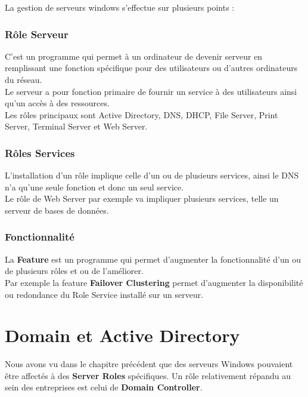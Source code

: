 \documentclass{report}
\begin{document}
		La gestion de serveurs windows s'effectue sur plusieurs points : \\

		\subsection{Rôle Serveur}

			C'est un programme qui permet à un ordinateur de devenir serveur en remplissant une fonction spécifique pour des utilisateurs ou d'autres ordinateurs du réseau.\\
			Le serveur a pour fonction primaire de fournir un service à des utilisateurs ainsi qu'un accès à des ressources.\\
			Les rôles principaux sont Active Directory, DNS, DHCP, File Server, Print Server, Terminal Server et Web Server.\\

		\subsection{Rôles Services}

			L'installation d'un rôle implique celle d'un ou de plusieurs services, ainsi le DNS n'a qu'une seule fonction et donc un seul service.\\
			Le rôle de Web Server par exemple va impliquer plusieurs services, telle un serveur de bases de données.\\

		\subsection{Fonctionnalité}

			La \textbf{Feature} est un programme qui permet d'augmenter la fonctionnalité d'un ou de plusieurs rôles et ou de l'améliorer.\\
			Par exemple la feature \textbf{Failover Clustering} permet d'augmenter la disponibilité ou redondance du Role Service installé sur un serveur.\\

\chapter{Domain et Active Directory}

	Nous avons vu dans le chapitre précédent que des serveurs Windows pouvaient être affectés à des \textbf{Server Roles} spécifiques. Un rôle relativement répandu au sein des entreprises est celui de \textbf{Domain Controller}.\\
\end{document}

